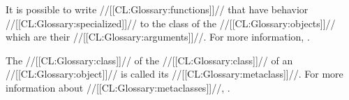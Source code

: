 It is possible to write //[[CL:Glossary:functions]]// that have behavior //[[CL:Glossary:specialized]]// to the class of the //[[CL:Glossary:objects]]// which are their //[[CL:Glossary:arguments]]//. For more information, \seesection\GFsAndMethods.

The //[[CL:Glossary:class]]// of the //[[CL:Glossary:class]]// of an //[[CL:Glossary:object]]//  is called its //[[CL:Glossary:metaclass]]//. For more information about //[[CL:Glossary:metaclasses]]//, \seesection\MetaObjects.
